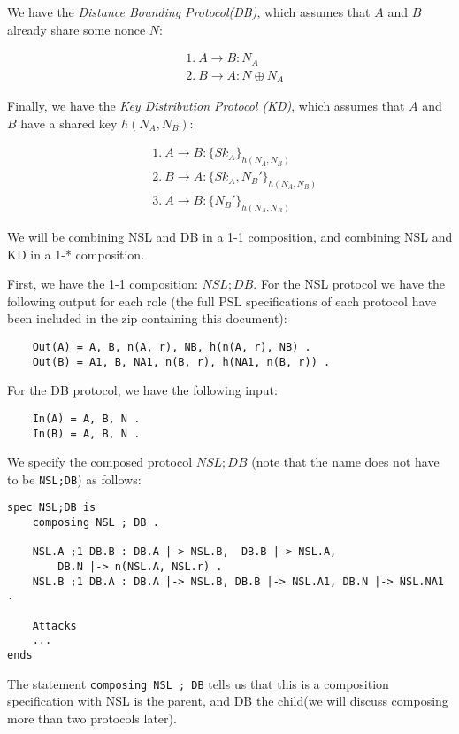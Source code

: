 \documentclass{article}
\begin{document}
We have the \textit{Distance Bounding Protocol(DB)}, which assumes that
$A$ and $B$ already share some nonce $N$:

\begin{align*}
    &1.~A \rightarrow B : N_A\\
    &2.~B \rightarrow A : N \oplus N_A
\end{align*}

Finally, we have the \textit{Key Distribution Protocol (KD)}, which
assumes that $A$ and $B$ have a shared key $h(N_A, N_B)$:

\begin{align*}
    &1.~A \rightarrow B : \{Sk_A\}_{h(N_A, N_B)}\\
    &2.~B \rightarrow A : \{Sk_A, N_B'\}_{h(N_A, N_B)}\\
    &3.~A \rightarrow B : \{N_B'\}_{h(N_A,N_B)}
\end{align*}

We will be combining NSL and DB in a 1-1 composition, and combining
NSL and KD in a 1-* composition.

First, we have the 1-1 composition: $\mathit{NSL} ; \mathit{DB}$. 
For the NSL protocol we have the following output for each
role (the full PSL specifications
of each protocol have been included in the zip containing this document):

\begin{verbatim}
    Out(A) = A, B, n(A, r), NB, h(n(A, r), NB) .
    Out(B) = A1, B, NA1, n(B, r), h(NA1, n(B, r)) .
\end{verbatim}

For the DB protocol, we have the following input:

\begin{verbatim}
    In(A) = A, B, N .
    In(B) = A, B, N .
\end{verbatim}

We specify the composed protocol $\mathit{NSL};\mathit{DB}$ (note that
the name does not have to be \verb|NSL;DB|) as follows:
\begin{verbatim}
spec NSL;DB is 
    composing NSL ; DB .

    NSL.A ;1 DB.B : DB.A |-> NSL.B,  DB.B |-> NSL.A, 
        DB.N |-> n(NSL.A, NSL.r) .
    NSL.B ;1 DB.A : DB.A |-> NSL.B, DB.B |-> NSL.A1, DB.N |-> NSL.NA1 . 

    Attacks        
    ...
ends
\end{verbatim}



The statement \verb|composing NSL ; DB| 
tells us that this is a composition specification with NSL is the parent,
and DB the child(we will discuss composing more than two 
protocols later).
\end{document}
